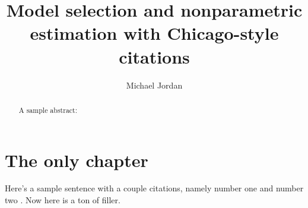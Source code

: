 \documentclass{csuthesis} %
\title{Model selection and nonparametric estimation with Chicago-style citations}
\author{Michael Jordan}
\begin{document}
\frontmatter

% 
\begin{abstract}
A sample abstract: \lipsum[1-2]
\end{abstract}

\begin{acknowledgements}
\lipsum[3]
\end{acknowledgements}%

\maketitle

\tableofcontents %

\mainmatter %
% 
%
%
%

\chapter{The only chapter}

Here's a sample sentence with a couple citations, namely number one \cite{multifrac} and number two \cite{infodim}.  Now here is a ton of filler.

\lipsum[4-5]

\backmatter


%
%
% 
\end{document}
